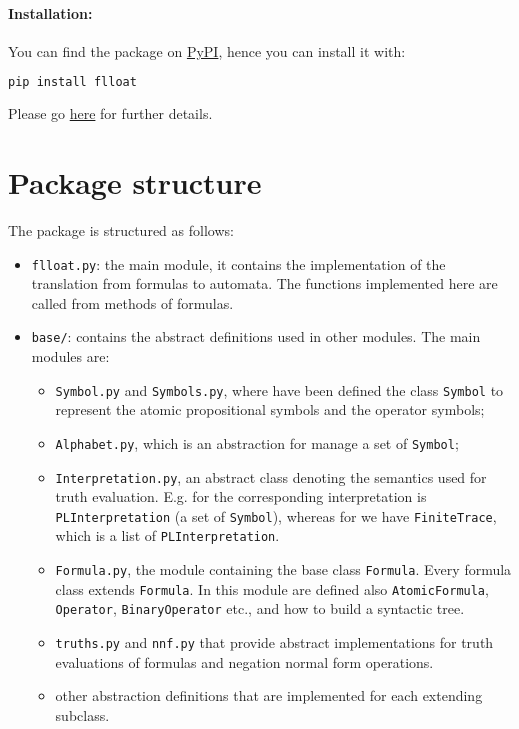 \paragraph{Installation:} You can find the package on \href{https://pypi.org/project/flloat/}{PyPI}, hence you can install it with:
\begin{lstlisting}[language=bash]
pip install flloat
\end{lstlisting}
Please go \href{https://github.com/MarcoFavorito/flloat#install}{here} for further details.


\section{Package structure}
The package is structured as follows:
\begin{itemize}
	\item \texttt{flloat.py}: the main module, it contains the implementation of the translation from \LLf formulas to automata. The functions implemented here are called from methods of \LLf formulas.
	\item \texttt{base/}: contains the abstract definitions used in other modules. The main modules are:
	\begin{itemize}
		\item \texttt{Symbol.py} and \texttt{Symbols.py}, where have been defined the class \texttt{Symbol} to represent the atomic propositional symbols and the operator symbols;
		\item \texttt{Alphabet.py}, which is an abstraction for manage a set of \texttt{Symbol};
		\item \texttt{Interpretation.py}, an abstract class denoting the semantics used for truth evaluation. E.g. for \PL the corresponding interpretation is \texttt{PLInterpretation} (a set of \texttt{Symbol}), whereas for \LLf we have \texttt{FiniteTrace}, which is a list of \texttt{PLInterpretation}.
		\item \texttt{Formula.py}, the module containing the base class \texttt{Formula}. Every formula class extends \texttt{Formula}. In this module are defined also \texttt{AtomicFormula}, \texttt{Operator}, \texttt{BinaryOperator} etc., and how to build a syntactic tree. 
		\item \texttt{truths.py} and \texttt{nnf.py} that provide abstract implementations for truth evaluations of formulas and negation normal form operations.
		\item other abstraction definitions that are implemented for each extending subclass.

\end{itemize}
\end{itemize}
